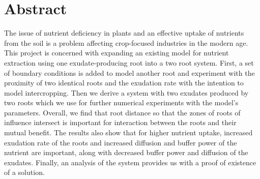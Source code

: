 \documentclass[11pt]{article}
\numberwithin{equation}{section}
\begin{document}




\newpage
\section*{Abstract}
The issue of nutrient deficiency in plants and an effective uptake of nutrients from the soil is a problem affecting crop-focused industries in the modern age. This project is concerned with expanding an existing model for nutrient extraction using one exudate-producing root into a two root system. First, a set of boundary conditions is added to model another root 
and experiment with the proximity of two identical roots and the exudation rate with the intention to model intercropping.
Then we derive a system with two exudates produced by two roots which we use for further numerical experiments with the model's parameters. Overall, we find that root distance so that the zones of roots of influence intersect is important for interaction between the roots and their mutual benefit. The results also show that for higher nutrient uptake, increased exudation rate of the roots and increased diffusion and buffer power of the nutrient are important, along with decreased buffer power and diffusion of the exudates.
Finally, an analysis of the system provides us with a proof of existence of a solution.

\newpage
\doublespacing
\tableofcontents

\singlespacing
\newpage
{}
\setcounter{page}{1}
\end{document}
